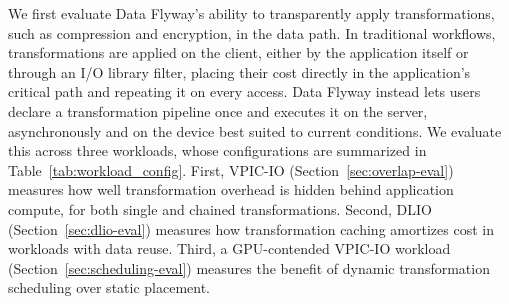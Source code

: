 We first evaluate Data Flyway's ability to transparently apply transformations, such as compression and encryption, in the data path. In traditional workflows, transformations are applied on the client, either by the application itself or through an I/O library filter, placing their cost directly in the application's critical path and repeating it on every access. Data Flyway instead lets users declare a transformation pipeline once and executes it on the server, asynchronously and on the device best suited to current conditions. We evaluate this across three workloads, whose configurations are summarized in Table~\ref{tab:workload_config}. First, VPIC-IO (Section~\ref{sec:overlap-eval}) measures how well transformation overhead is hidden behind application compute, for both single and chained transformations. Second, DLIO (Section~\ref{sec:dlio-eval}) measures how transformation caching amortizes cost in workloads with data reuse. Third, a GPU-contended VPIC-IO workload (Section~\ref{sec:scheduling-eval}) measures the benefit of dynamic transformation scheduling over static placement.

\begin{table}[tp]
\caption{Workload-specific experimental configuration.}
\label{tab:workload_config}
\centering
\small
{}
\par{}
\end{table}

